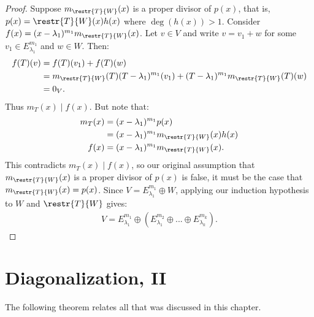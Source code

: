 \begin{proof}
            Suppose $m_\restr{T}{W}(x)$ is a proper divisor of $p(x)$, that is, $p(x) = \restr{T}{W}(x)h(x)$ where $\deg(h(x)) > 1$. Consider $f(x) = (x-\lambda_1)^{m_1}m_\restr{T}{W}(x)$. Let $v \in V$ and write $v = v_1 + w$ for some $v_1 \in E_{\lambda_1}^{m_1}$ and $w \in W$. Then:
                \begin{equation*}
                \begin{split}
                    f(T)(v)
                    & = f(T)(v_1) + f(T)(w) \\
                    & = m_\restr{T}{W}(T)(T-\lambda_1)^{m_1}(v_1) + (T-\lambda_1)^{m_1}m_\restr{T}{W}(T)(w) \\
                    & = 0_V.
                \end{split}
                \end{equation*}
            Thus $m_T(x) \mid f(x)$. But note that:
                \begin{equation*}
                \begin{split}
                    m_T(x) &= (x-\lambda_1)^{m_1}p(x)\\
                     & = (x-\lambda_1)^{m_1} m_\restr{T}{W}(x)h(x)\\
                     f(x) & = (x-\lambda_1)^{m_1}m_\restr{T}{W}(x).
                \end{split}
                \end{equation*}
            This contradicts $m_T(x) \mid f(x)$, so our original assumption that $m_\restr{T}{W}(x)$ is a proper divisor of $p(x)$ is false, it must be the case that $m_\restr{T}{W}(x) = p(x)$. Since $V = E_{\lambda_1}^{m_1} \oplus W$, applying our induction hypothesis to $W$ and $\restr{T}{W}$ gives:
                \begin{equation*}
                \begin{split}
                    V = E_{\lambda_1}^{m_1} \oplus \left(E_{\lambda_1}^{m_2} \oplus ... \oplus E_{\lambda_k}^{m_k}\right).
                \end{split}
                \end{equation*}
        \end{proof}

\section{Diagonalization, II}
    The following theorem relates all that was discussed in this chapter.
    \begin{theorem}
        
    \end{theorem}


            

    
        



    

    


